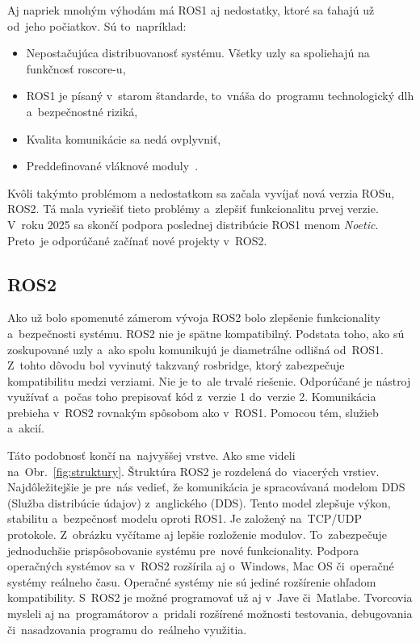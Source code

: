 Aj napriek mnohým výhodám má ROS1 aj nedostatky, ktoré sa ťahajú už od~jeho počiatkov. Sú to~napríklad:
\begin{itemize}
	\item Nepostačujúca distribuovanosť systému. Všetky uzly sa spoliehajú na funkčnosť roscore-u,
	\item ROS1 je písaný v~starom štandarde, to~vnáša do~programu technologický dlh a~bezpečnostné riziká,
	\item Kvalita komunikácie sa nedá ovplyvniť,
	\item Preddefinované vláknové moduly~\cite{ROS2design}.
\end{itemize}

Kvôli takýmto problémom a nedostatkom sa začala vyvíjať nová verzia ROSu, ROS2. Tá mala vyriešiť tieto problémy a~zlepšiť funkcionalitu prvej verzie.
V~roku 2025 sa skončí podpora poslednej distribúcie ROS1 menom \textit{Noetic}. Preto~je odporúčané začínať nové projekty v~ROS2.

\subsection{ROS2}

Ako už bolo spomenuté zámerom vývoja ROS2 bolo zlepšenie funkcionality a~bezpečnosti systému. ROS2 nie je spätne kompatibilný.
Podstata toho, ako sú zoskupované uzly a~ako spolu komunikujú je diametrálne odlišná od~ROS1. Z~tohto dôvodu bol vyvinutý takzvaný rosbridge,
ktorý zabezpečuje kompatibilitu medzi verziami. Nie je to~ale trvalé riešenie. Odporúčané je nástroj využívať a~počas toho prepisovať kód
z~verzie 1 do~verzie 2. Komunikácia prebieha v~ROS2 rovnakým spôsobom ako v~ROS1. Pomocou tém, služieb a~akcií.

Táto podobnosť končí na~najvyššej vrstve. Ako sme videli na~Obr.~\ref{fig:struktury}. Štruktúra ROS2 je rozdelená do~viacerých vrstiev.
Najdôležitejšie je pre~nás vedieť, že komunikácia je spracovávaná modelom DDS (Služba distribúcie údajov) z~anglického (\acrlong{DDS}). Tento model
zlepšuje výkon, stabilitu a~bezpečnosť modelu oproti ROS1. Je založený na~TCP/UDP protokole. Z~obrázku vyčítame aj lepšie rozloženie modulov.
To~zabezpečuje jednoduchšie prispôsobovanie systému pre~nové funkcionality. Podpora operačných systémov sa v~ROS2 rozšírila aj o~Windows, Mac OS
či~operačné systémy reálneho času. Operačné systémy nie sú jediné rozšírenie ohľadom kompatibility. S~ROS2 je možné programovať už aj v~Jave či~Matlabe.
Tvorcovia mysleli aj na~programátorov a~pridali rozšírené možnosti testovania, debugovania či~nasadzovania programu do~reálneho využitia.

